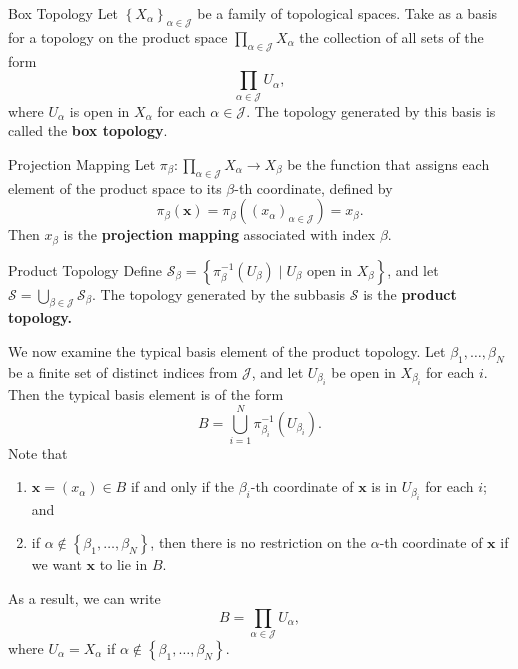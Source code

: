 \documentclass[10pt]{report}
\begin{document}
\begin{defn}{Box Topology}{}
Let $\left\{ X_{\alpha} \right\}_{\alpha\in\mathcal{J}}$ be a family of topological spaces. Take as a basis for a topology on the product space $\prod_{\alpha\in\mathcal{J}}X_{\alpha}$ the collection of all sets of the form
\[
\prod_{\alpha\in\mathcal{J}}U_{\alpha},
\] where $U_{\alpha}$ is open in $X_{\alpha}$ for each $\alpha\in\mathcal{J}$. The topology generated by this basis is called the \textbf{box topology}.
\end{defn}

\begin{defn}{Projection Mapping}{}
Let $\pi_{\beta}:\prod_{\alpha\in\mathcal{J}}X_{\alpha}\to X_{\beta}$ be the function that assigns each element of the product space to its $\beta$-th coordinate, defined by
\[
	\pi_{\beta}(\mathbf{x}) = \pi_{\beta}( (x_{\alpha})_{\alpha\in\mathcal{J}}) = x_{\beta}.
\] Then $x_{\beta}$ is the \textbf{projection mapping} associated with index $\beta$.
\end{defn}

\begin{defn}{Product Topology}{}
	Define $\mathcal{S}_{\beta} = \left\{ \pi_{\beta}^{-1}(U_{\beta}) \;|\; U_{\beta} \text{ open in } X_{\beta} \right\}$, and let $\mathcal{S} = \bigcup_{\beta\in\mathcal{J}} \mathcal{S}_{\beta}$. The topology generated by the subbasis $\mathcal{S}$ is the \textbf{product topology.} 
\end{defn}

We now examine the typical basis element of the product topology. Let $\beta_1, \dots, \beta_N$ be a finite set of distinct indices from $\mathcal{J}$, and let $U_{\beta_i}$ be open in $X_{\beta_i}$ for each $i$. Then the typical basis element is of the form
\[
	B = \bigcup_{i=1}^N \pi_{\beta_i}^{-1}(U_{\beta_i}).
\] Note that
\begin{enumerate}
	\item $\mathbf{x}=(x_{\alpha}) \in B$ if and only if the $\beta_i$-th coordinate of $\mathbf{x}$ is in $U_{\beta_i}$ for each $i$; and
	\item if $\alpha \not\in \left\{ \beta_1, \dots, \beta_N \right\}$, then there is no restriction on the $\alpha$-th coordinate of $\mathbf{x}$ if we want $\mathbf{x}$ to lie in $B$.
\end{enumerate}
As a result, we can write
\[
B = \prod_{\alpha\in\mathcal{J}}U_{\alpha},
\] where $U_{\alpha}=X_{\alpha}$ if $\alpha \not\in \left\{ \beta_1, \dots, \beta_N \right\}$.
\end{document}
